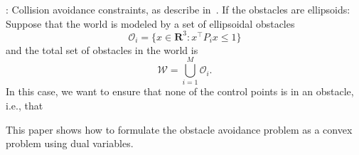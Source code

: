 %


\cite{LutzMeurer21}:  Collision avoidance constraints, as describe in~\cite{LutzMeurer21}.
If the obstacles are ellipsoids:  Suppose that the world is modeled by a set of ellipsoidal obstacles
\[
\mathcal{O}_i = \{x\in\mathbf{R}^3: x^\top P_i x \leq 1\}
\]
and the total set of obstacles in the world is 
\[
\mathcal{W} = \bigcup_{i=1}^{M} \mathcal{O}_i.
\]
In this case, we want to ensure that none of the control points is in an obstacle, i.e., that

This paper shows how to formulate the obstacle avoidance problem as a convex problem using dual variables.
%





%
%
%


